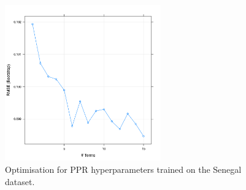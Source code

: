 \documentclass[review]{elsarticle}
\begin{document}
\begin{figure}[h!]
  \centering
  \includegraphics[width=0.6\textwidth]{figs/SI/ppropt_sen.png}
\caption{
  Optimisation for PPR hyperparameters trained on the Senegal dataset.
}

\end{figure}



% 
%
%
\end{document}
